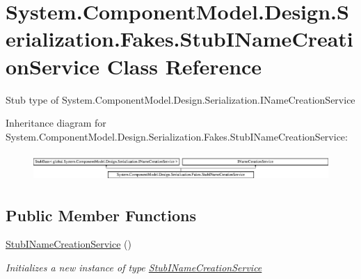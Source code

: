 \hypertarget{class_system_1_1_component_model_1_1_design_1_1_serialization_1_1_fakes_1_1_stub_i_name_creation_service}{\section{System.\-Component\-Model.\-Design.\-Serialization.\-Fakes.\-Stub\-I\-Name\-Creation\-Service Class Reference}
\label{class_system_1_1_component_model_1_1_design_1_1_serialization_1_1_fakes_1_1_stub_i_name_creation_service}
}


Stub type of System.\-Component\-Model.\-Design.\-Serialization.\-I\-Name\-Creation\-Service 


Inheritance diagram for System.\-Component\-Model.\-Design.\-Serialization.\-Fakes.\-Stub\-I\-Name\-Creation\-Service\-:\begin{figure}[H]
\begin{center}
\leavevmode
\includegraphics[height=1.068702cm]{class_system_1_1_component_model_1_1_design_1_1_serialization_1_1_fakes_1_1_stub_i_name_creation_service}
\end{center}
\end{figure}
\subsection*{Public Member Functions}
\begin{DoxyCompactItemize}
\item 
\hyperlink{class_system_1_1_component_model_1_1_design_1_1_serialization_1_1_fakes_1_1_stub_i_name_creation_service_a4468020a9ec2c5b2fe67efbc8769119e}{Stub\-I\-Name\-Creation\-Service} ()
\begin{DoxyCompactList}\small\item\em Initializes a new instance of type \hyperlink{class_system_1_1_component_model_1_1_design_1_1_serialization_1_1_fakes_1_1_stub_i_name_creation_service}{Stub\-I\-Name\-Creation\-Service}\end{DoxyCompactList}\end{DoxyCompactItemize}
